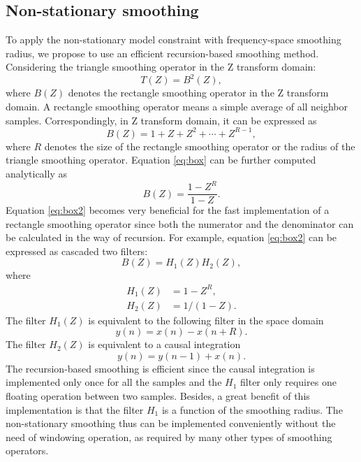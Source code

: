 \subsection{Non-stationary smoothing}
To apply the non-stationary model constraint with frequency-space smoothing radius, we propose to use an efficient recursion-based smoothing method. Considering the triangle smoothing operator in the Z transform domain:
\begin{equation}
\label{eq:tri}
T(Z)=B^2(Z),
\end{equation}
where $B(Z)$ denotes the rectangle smoothing operator in the Z transform domain. A rectangle smoothing operator means a simple average of all neighbor samples. Correspondingly, in Z transform domain, it can be expressed as
\begin{equation}
\label{eq:box}
B(Z) = 1 + Z + Z^2 +\cdots + Z^{R-1},
\end{equation}
where $R$ denotes the size of the rectangle smoothing operator or the radius of the triangle smoothing operator.  Equation \ref{eq:box} can be further computed analytically as
\begin{equation}
\label{eq:box2}
B(Z) = \frac{1-Z^R}{1-Z}.
\end{equation}
Equation \ref{eq:box2} becomes very beneficial for the fast implementation of a rectangle smoothing operator since both the numerator and the denominator can be calculated in the way of recursion. For example, equation \ref{eq:box2} can be expressed as cascaded two filters:
\begin{equation}
\label{eq:box3}
B(Z) = H_1(Z)H_2(Z),
\end{equation}
where
\begin{equation}
\label{eq:box31}
\begin{split}
H_1(Z)&=1-Z^R,\\
H_2(Z)&=1/(1-Z).
\end{split}
\end{equation}
The filter $H_1(Z)$ is equivalent to the following filter in the space domain
\begin{equation}
\label{eq:h1}
y(n)=x(n)-x(n+R).
\end{equation}
The filter $H_2(Z)$ is equivalent to a causal integration 
\begin{equation}
\label{eq:h2}
y(n)=y(n-1)+x(n).
\end{equation}
The recursion-based smoothing is efficient since the causal integration is implemented only once for all the samples and the $H_1$ filter only requires one floating operation between two samples. Besides, a great benefit of this implementation is that the filter $H_1$ is a function of the smoothing radius. The non-stationary smoothing thus can be implemented conveniently without the need of windowing operation, as required by many other types of smoothing operators. 

